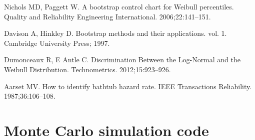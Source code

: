 \documentclass[10pt,letterpaper]{article}
\begin{document}
\begin{thebibliography}{99}
 Nichols MD, Paggett W. A bootstrap control chart for Weibull percentiles. Quality and Reliability Engineering International. 2006;22:141--151.

 Davison A, Hinkley D. Bootstrap methods and their applications. vol. 1. Cambridge University Press; 1997.

 Dumonceaux R, E Antle C. Discrimination Between the Log-Normal and the Weibull Distribution. Technometrics. 2012;15:923--926.

 Aarset MV. How to identify bathtub hazard rate. IEEE Transactions Reliability. 1987;36:106--108.
\end{thebibliography}

\appendix

\section{Monte Carlo simulation code}
\label{code:simulation_mc}
\end{document}

